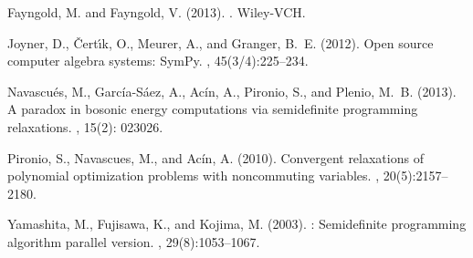 \documentclass{article}
\begin{document}
\begin{thebibliography}{}

Fayngold, M. and Fayngold, V. (2013).
.
\newblock Wiley-VCH.

Joyner, D., {\v{C}}ert{\'\i}k, O., Meurer, A., and Granger, B.~E. (2012).
\newblock Open source computer algebra systems: {SymPy}.
, 45(3/4):225--234.

Navascu\'es, M., Garc\'ia-S\'aez, A., Ac\'in, A., Pironio, S., and Plenio, M.~B. (2013).
\newblock A paradox in bosonic energy computations via semidefinite programming relaxations.
, 15(2): 023026.

Pironio, S., Navascues, M., and Ac\'in, A. (2010).
\newblock Convergent relaxations of polynomial optimization problems with
  noncommuting variables.
, 20(5):2157--2180.

Yamashita, M., Fujisawa, K., and Kojima, M. (2003).
: Semidefinite programming algorithm parallel version.
, 29(8):1053--1067.

\end{thebibliography}
\end{document}
